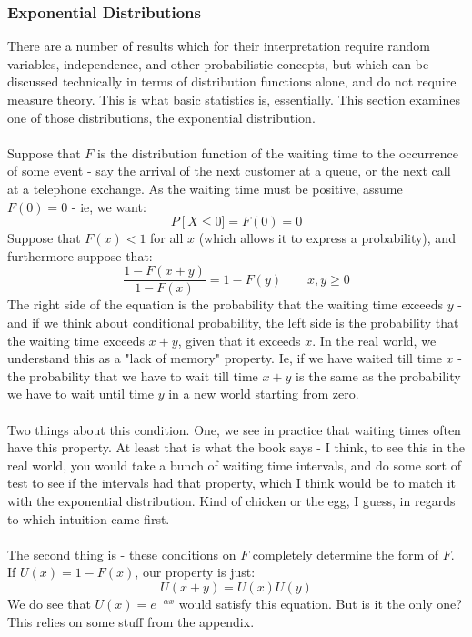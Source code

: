 \documentclass[12pt,a4paper]{article}
\newcommand{\1}[1]{\mathbbm{1}\left\{ #1 \right\}}
\begin{document}
\subsubsection{Exponential Distributions}
There are a number of results which for their interpretation require random variables, independence, and other probabilistic concepts, but which can be discussed technically in terms of distribution functions alone, and do not require measure theory. This is what basic statistics is, essentially. This section examines one of those distributions, the exponential distribution.
\\\\
Suppose that $F$ is the distribution function of the waiting time to the occurrence of some event - say the arrival of the next customer at a queue, or the next call at a telephone exchange. As the waiting time must be positive, assume $F(0) = 0$ - ie, we want:
$$
	P\left[X \leq 0] = F(0) = 0
$$
Suppose that $F(x) < 1$ for all $x$ (which allows it to express a probability), and furthermore suppose that:
$$
	\frac{1 - F(x + y)}{1 - F(x)} = 1 - F(y) \quad\quad x,y \geq 0
$$
The right side of the equation is the probability that the waiting time exceeds $y$ - and if we think about conditional probability, the left side is the probability that the waiting time exceeds $x + y$, given that it exceeds $x$. In the real world, we understand this as a "lack of memory" property. Ie, if we have waited till time $x$ - the probability that we have to wait till time $x + y$ is the same as the probability we have to wait until time $y$ in a new world starting from zero.
\\\\
Two things about this condition. One, we see in practice that waiting times often have this property. At least that is what the book says - I think, to see this in the real world, you would take a bunch of waiting time intervals, and do some sort of test to see if the intervals had that property, which I think would be to match it with the exponential distribution. Kind of chicken or the egg, I guess, in regards to which intuition came first.
\\\\
The second thing is - these conditions on $F$ completely determine the form of $F$. If $U(x) = 1 - F(x)$, our property is just:
$$
	U(x + y) = U(x)U(y)
$$
We do see that $U(x) = e^{-\alpha x}$ would satisfy this equation. But is it the only one? This relies on some stuff from the appendix.
\end{document}
